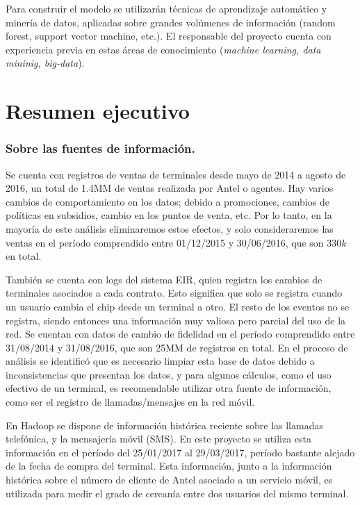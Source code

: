 Para construir el modelo se utilizarán técnicas de aprendizaje automático y minería
de datos, aplicadas sobre grandes volúmenes de información (random forest, support vector machine, etc.). 
El responsable del proyecto cuenta con experiencia previa
en estas áreas de conocimiento  (\emph{machine learning,  data mininig, big-data}).


\section{Resumen ejecutivo}
\label{sec:ejecutivo}

\subsubsection{Sobre las fuentes de información.}
Se cuenta con registros de ventas de terminales desde mayo de 2014 a agosto de 2016, un total de
1.4MM de ventas realizada por Antel o agentes. 
Hay varios cambios de comportamiento en los datos; debido a promociones,
cambios de políticas en subsidios, cambio en los puntos de venta, etc. 
Por lo tanto, en la mayoría de este análisis eliminaremos estos efectos, 
y solo consideraremos las ventas en el período comprendido entre 01/12/2015 y 30/06/2016, que son $330k$ en total.

También se cuenta con logs del sistema EIR, quien registra los cambios de terminales asociados a cada contrato. 
Esto significa que solo se registra cuando un usuario cambia el chip desde un terminal a otro.
El resto de los eventos no se registra, siendo entonces una información muy valiosa pero parcial del uso de la red.
Se cuentan con datos de cambio de fidelidad en el período comprendido entre 31/08/2014 y 31/08/2016, 
que son 25MM de registros en total.
En el proceso de análisis se identificó que es necesario limpiar esta base de datos debido a inconsistencias que presentan los datos, 
y para algunos cálculos, como el uso efectivo de un terminal, es recomendable utilizar otra fuente de información, como ser el registro de llamadas/mensajes en la red móvil.

En Hadoop se dispone de información histórica reciente sobre las llamadas telefónica,
y la mensajería móvil (SMS). En este proyecto se utiliza esta información en el período del
25/01/2017 al 29/03/2017, período bastante alejado de la fecha de compra del terminal.
Esta información, junto a la información histórica sobre el número de cliente de Antel asociado
a un servicio móvil, es utilizada para medir el grado de cercanía entre dos usuarios del mismo terminal.

